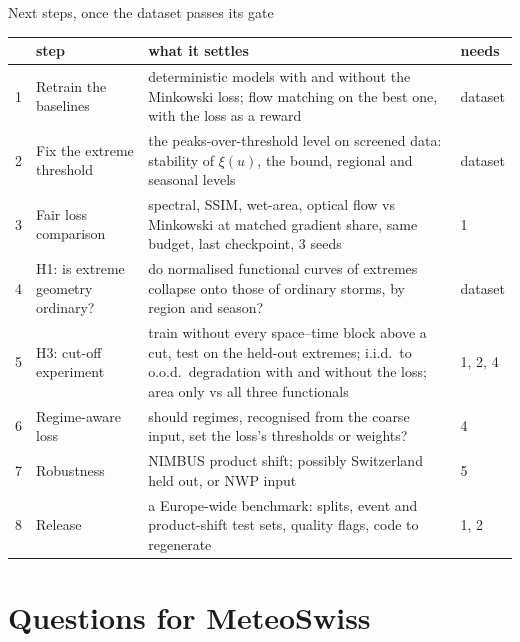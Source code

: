 \documentclass[aspectratio=169,10pt]{beamer}
\begin{document}
\begin{frame}{Next steps, once the dataset passes its gate}
  \scriptsize
  \centering
  \renewcommand{\arraystretch}{1.15}
  \begin{tabular}{l>{\raggedright\arraybackslash}p{3.3cm}>{\raggedright\arraybackslash}p{7.6cm}l}
    \toprule
    & step & what it settles & needs \\
    \midrule
    1 & Retrain the baselines & deterministic models with and without the Minkowski loss;
        flow matching on the best one, with the loss as a reward & dataset \\
    2 & Fix the extreme threshold & the peaks-over-threshold level on screened data: stability of
        $\xi(u)$, the bound, regional and seasonal levels & dataset \\
    3 & Fair loss comparison & spectral, SSIM, wet-area, optical flow vs Minkowski at matched
        gradient share, same budget, last checkpoint, 3 seeds & 1 \\
    4 & H1: is extreme geometry ordinary? & do normalised functional curves of extremes collapse
        onto those of ordinary storms, by region and season? & dataset \\
    5 & H3: cut-off experiment & train without every space--time block above a cut, test on the
        held-out extremes; i.i.d.\ to o.o.d.\ degradation with and without the loss; area only vs
        all three functionals & 1, 2, 4 \\
    6 & Regime-aware loss & should regimes, recognised from the coarse input, set the loss's
        thresholds or weights? & 4 \\
    7 & Robustness & NIMBUS product shift; possibly Switzerland held out, or NWP input & 5 \\
    8 & Release & a Europe-wide benchmark: splits, event and product-shift test sets, quality
        flags, code to regenerate & 1, 2 \\
    \bottomrule
  \end{tabular}
\end{frame}

\section{Questions for MeteoSwiss}
\end{document}
